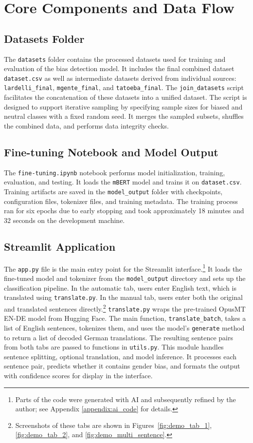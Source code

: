 \section{Core Components and Data Flow}
    \subsection{Datasets Folder}
        The \texttt{datasets} folder contains the processed datasets used for training and evaluation of the bias detection model. It includes the final combined dataset \texttt{dataset.csv} as well as intermediate datasets derived from individual sources: \texttt{lardelli\_final}, \texttt{mgente\_final}, and \texttt{tatoeba\_final}. The \texttt{join\_datasets} script facilitates the concatenation of these datasets into a unified dataset. The script is designed to support iterative sampling by specifying sample sizes for biased and neutral classes with a fixed random seed. It merges the sampled subsets, shuffles the combined data, and performs data integrity checks. 

    \subsection{Fine-tuning Notebook and Model Output}
        The \texttt{fine-tuning.ipynb} notebook performs model initialization, training, evaluation, and testing. It loads the \texttt{mBERT} model and trains it on \texttt{dataset.csv}. Training artifacts are saved in the \texttt{model\_output} folder with checkpoints, configuration files, tokenizer files, and training metadata. The training process ran for six epochs due to early stopping and took approximately 18 minutes and 32 seconds on the development machine. 

    \subsection{Streamlit Application}
        The \texttt{app.py} file is the main entry point for the Streamlit interface.\footnote{Parts of the code were generated with AI and subsequently refined by the author; see Appendix \ref{appendix:ai_code} for details.}
        It loads the fine-tuned model and tokenizer from the \texttt{model\_output} directory and sets up the classification pipeline. In the automatic tab, users enter English text, which is translated using \texttt{translate.py}. In the manual tab, users enter both the original and translated sentences directly.\footnote{Screenshots of these tabs are shown in Figures~\ref{fig:demo_tab_1}, \ref{fig:demo_tab_2}, and \ref{fig:demo_multi_sentence}.} \texttt{translate.py} wraps the pre-trained OpusMT EN-DE model from Hugging Face. The main function, \texttt{translate\_batch}, takes a list of English sentences, tokenizes them, and uses the model’s \texttt{generate} method to return a list of decoded German translations. The resulting sentence pairs from both tabs are passed to functions in \texttt{utils.py}. This module handles sentence splitting, optional translation, and model inference. It processes each sentence pair, predicts whether it contains gender bias, and formats the output with confidence scores for display in the interface.

